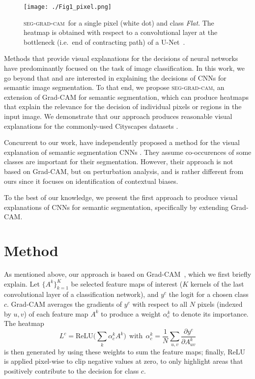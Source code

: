 \documentclass[letterpaper]{article} %
\newcommand{\sgc}{\mbox{\small\textsc{seg-grad-cam}}}
\begin{document}
\begin{figure}[t]
\centering
\texttt{[image: ./Fig1\_pixel.png]}%
\caption{%
\sgc\ for a single pixel (white dot) and class \emph{Flat}.
The heatmap is obtained with
respect to a convolutional layer at the bottleneck (i.e.~end of contracting path) of a U-Net~\cite{ronneberger2015u}.
}
\label{fig:example_cityscape}
\end{figure}

Methods that provide visual explanations for the decisions of neural networks have predominantly focused on the task of image classification.
In this work, we go beyond that and are interested in explaining the decisions of CNNs for semantic image segmentation.
To that end, we propose \sgc, an extension of Grad-CAM for semantic segmentation, which can produce heatmaps that explain the relevance for the decision of individual pixels or regions in the input image.
%
We demonstrate that our approach produces reasonable visual explanations for the commonly-used
Cityscapes datasets \cite{Cordts2016Cityscapes}.

Concurrent to our work, \citeauthor{hoyer2019grid} have independently proposed a method for the visual explanation of semantic segmentation CNNs \cite{hoyer2019grid}. They assume co-occurences of some classes are important for their segmentation. However, their approach is not based on Grad-CAM, but on perturbation analysis, and is rather different from ours since it focuses on identification of contextual biases.
%

To the best of our knowledge, we present the first approach to produce visual explanations of CNNs for semantic segmentation, specifically by extending Grad-CAM.






\section{Method}
\label{sec:method}

As mentioned above, our approach is based on Grad-CAM~\cite{selvaraju2017grad}, which we first briefly explain.
%
Let $\{A^k\}_{k=1}^K$ be selected feature maps of interest ($K$ kernels of the last convolutional layer of a classification network), and $y^c$ the logit for a chosen class $c$.
%
Grad-CAM averages the gradients of $y^c$ with respect to all $N$ pixels (indexed by $u,v$) of each feature map $A^k$
to produce a weight $\alpha_c^k$ to denote its importance.
The heatmap
\begin{equation}
    \label{eq:grad-cam}
    L^c = \mathrm{ReLU}\biggl(\sum_k \alpha_c^k A^k \biggr)
    \ \ \text{with}\ \
    \alpha_c^k = \frac{1}{N} \sum_{u,v} \frac{\partial y^c}{\partial A_{uv}^k}
\end{equation}
is then generated by using these weights to sum the feature maps;
finally, $\mathrm{ReLU}$ is applied pixel-wise to clip negative values at zero,
to only highlight areas that positively contribute to the decision for class $c$.
\end{document}
